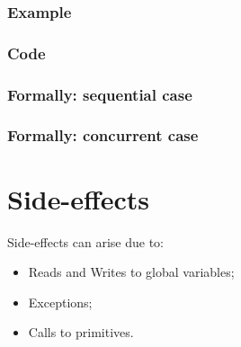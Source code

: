 \documentclass{book}
\begin{document}
  \subsection{Example}

  \subsection{Code}

\begin{emptyformal}
  \subsection{Formally: sequential case}

  \subsection{Formally: concurrent case}
\end{emptyformal}


\chapter{Side-effects}

Side-effects can arise due to:
\begin{itemize}
\item Reads and Writes to global variables;
\item Exceptions;
\item Calls to primitives.
\end{itemize}



\end{document}

